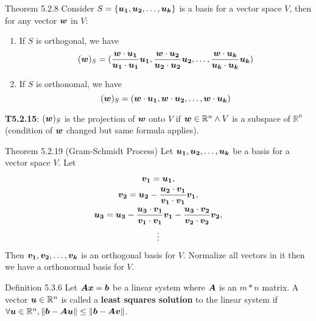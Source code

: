 \documentclass[10pt,portrait]{article}
\begin{document}
\begin{multicols}{2}
\begin{justifying}
\begin{namedthm*}{Theorem 5.2.8}
	Consider \(S = \{\bm{u_1}, \bm{u_2}, \dots, \bm{u_k}\}\) is a basis for a vector space \(V\), then for any vector \(\bm{w}\) in \(V\):
	\begin{enumerate}
		\item If \(S\) is orthogonal, we have
		\[
		    (\bm{w})_S = (\frac{\bm{w}\cdot\bm{u_1}}{\bm{u_1}\cdot\bm{u_1}}\bm{u_1}, \frac{\bm{w}\cdot\bm{u_2}}{\bm{u_2}\cdot\bm{u_2}}\bm{u_2}, \dots, \frac{\bm{w}\cdot\bm{u_k}}{\bm{u_k}\cdot\bm{u_k}}\bm{u_k})
		\]
		\item If \(S\) is orthonomal, we have
		\[
		    (\bm{w})_S = (\bm{w}\cdot\bm{u_1}, \bm{w}\cdot\bm{u_2}, \dots, \bm{w}\cdot\bm{u_k})
		\]
	\end{enumerate}
    \textbf{T5.2.15}: \((\bm{w})_S\) is the projection of \(\bm{w}\) onto \(V\) if \(\bm{w} \in \mathbb{R}^n \land V\) is a subspace of \(\mathbb{R}^n\) (condition of \(\bm{w}\) changed but same formula applies).
\end{namedthm*}

\begin{namedthm*}{Theorem 5.2.19 (Gram-Schmidt Process)}
	Let {\(\bm{u_1}, \bm{u_2}, \dots, \bm{u_k}\)} be a basis for a vector space \(V\). Let
	\begin{gather*}
	    \bm{v_1} = \bm{u_1},\\
	    \bm{v_2} = \bm{u_2} - \frac{\bm{u_2}\cdot\bm{v_1}}{\bm{v_1}\cdot\bm{v_1}}\bm{v_1},\\
	    \bm{u_3} = \bm{u_3} - \frac{\bm{u_3}\cdot\bm{v_1}}{\bm{v_1}\cdot\bm{v_1}}\bm{v_1} - \frac{\bm{u_3}\cdot\bm{v_2}}{\bm{v_2}\cdot\bm{v_2}}\bm{v_2},\\
	    \vdots
	\end{gather*}
	Then {\(\bm{v_1}, \bm{v_2}, \dots, \bm{v_k}\)} is an orthogonal basis for \(V\). Normalize all vectors in it then we have a orthonormal basis for \(V\).
\end{namedthm*}

\begin{namedthm*}{Definition 5.3.6}
	Let \(\bm{A}\bm{x} = \bm{b}\) be a linear system where \(\bm{A}\) is an \(m * n\) matrix. A vector \(\bm{u} \in \mathbb{R}^n\) is called a \textbf{least squares solution} to the linear system if \(\forall \bm{u} \in \mathbb{R}^n, \norm{\bm{b} - \bm{A}\bm{u}} \le \norm{\bm{b} - \bm{A}\bm{v}}\).
\end{namedthm*}


\end{justifying}
\end{multicols}
\end{document}
